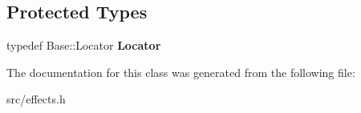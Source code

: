 \subsection*{Protected Types}
\begin{DoxyCompactItemize}
\item 
\hypertarget{classv8_1_1internal_1_1_effects_mixin_adef436e550ff90b867f2697f1ff9b7e5}{}typedef Base\+::\+Locator {\bfseries Locator}\label{classv8_1_1internal_1_1_effects_mixin_adef436e550ff90b867f2697f1ff9b7e5}

\end{DoxyCompactItemize}


The documentation for this class was generated from the following file\+:\begin{DoxyCompactItemize}
\item 
src/effects.\+h\end{DoxyCompactItemize}
